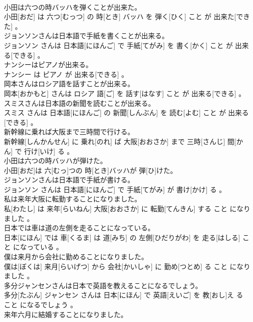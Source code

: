 \documentclass[8pt]{extreport}
\begin{document}
\begin{CJK}{UTF8}{min}
\\	小田は六つの時バッハを弾くことが出来た。	
\\	小田[おだ] は 六つ[むっつ] の 時[とき] バッハ を 弾く[ひく] こと が 出来た[できた] 。
\\	ジョンソンさんは日本語で手紙を書くことが出来る。	
\\	ジョンソン さんは 日本語[にほんご] で 手紙[てがみ] を 書く[かく] こと が 出来る[できる] 。
\\	ナンシーはピアノが出来る。	
\\	ナンシー は ピアノ が 出来る[できる] 。
\\	岡本さんはロシア語を話すことが出来る。	
\\	岡本[おかもと] さんは ロシア 語[ご] を 話す[はなす] こと が 出来る[できる] 。
\\	スミスさんは日本語の新聞を読むことが出来る。	
\\	スミス さんは 日本語[にほんご] の 新聞[しんぶん] を 読む[よむ] こと が 出来る[できる] 。
\\	新幹線に乗れば大阪まで三時間で行ける。	
\\	新幹線[しんかんせん] に 乗れ[のれ] ば 大阪[おおさか] まで 三時[さんじ] 間[かん] で 行け[いけ] る 。
\\	小田は六つの時バッハが弾けた。	
\\	小田[おだ]は 六[むっ]つの 時[とき]バッハが 弾[ひ]けた。
\\	ジョンソンさんは日本語で手紙が書ける。	
\\	ジョンソン さんは 日本語[にほんご] で 手紙[てがみ] が 書け[かけ] る 。
\\	私は来年大阪に転勤することになりました。	
\\	私[わたし] は 来年[らいねん] 大阪[おおさか] に 転勤[てんきん] する こと になりました 。
\\	日本では車は道の左側を走ることになっている。	
\\	日本[にほん] では 車[くるま] は 道[みち] の 左側[ひだりがわ] を 走る[はしる] こと になっている 。
\\	僕は来月から会社に勤めることになりました。	
\\	僕は[ぼくは] 来月[らいげつ] から 会社[かいしゃ] に 勤め[つとめ] る こと になりました 。
\\	多分ジャンセンさんは日本で英語を教えることになるでしょう。	
\\	多分[たぶん] ジャンセン さんは 日本[にほん] で 英語[えいご] を 教[おし]え る こと になるでしょう 。
\\	来年六月に結婚することになりました。	

\end{CJK}
\end{document}
